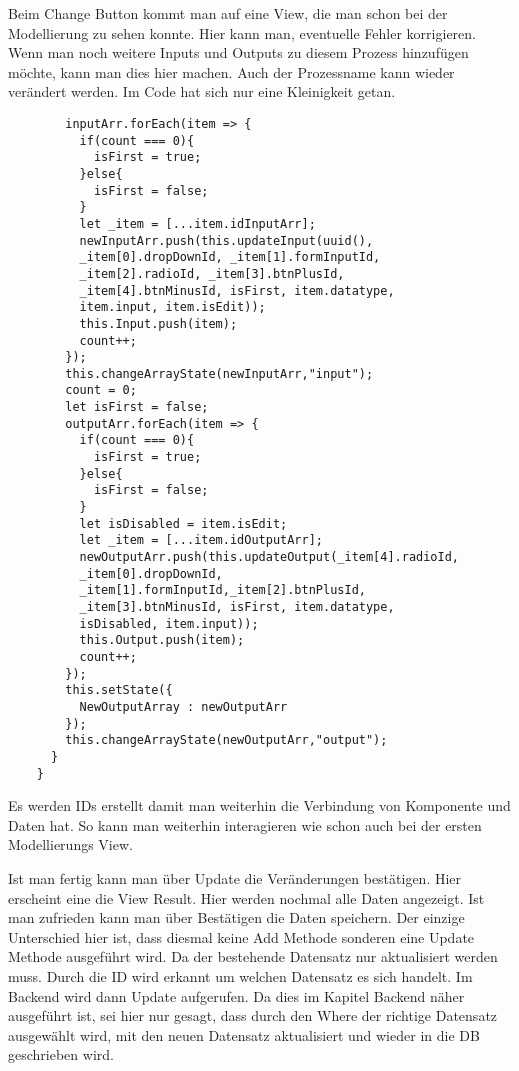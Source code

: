\documentclass[a4paper,11pt]{scrreprt}
\begin{document}
Beim Change Button kommt man auf eine View, die man schon bei der Modellierung zu sehen konnte. Hier kann man, eventuelle Fehler korrigieren. Wenn man noch weitere Inputs und Outputs zu diesem Prozess hinzufügen möchte, kann man dies hier machen. Auch der Prozessname kann wieder verändert werden. 
Im Code hat sich nur eine Kleinigkeit getan. 
\begin{lstlisting}
        inputArr.forEach(item => {
          if(count === 0){
            isFirst = true;
          }else{
            isFirst = false;
          }
          let _item = [...item.idInputArr];
          newInputArr.push(this.updateInput(uuid(),
          _item[0].dropDownId, _item[1].formInputId,
          _item[2].radioId, _item[3].btnPlusId,
          _item[4].btnMinusId, isFirst, item.datatype,
          item.input, item.isEdit));
          this.Input.push(item);
          count++;
        });
        this.changeArrayState(newInputArr,"input");
        count = 0;
        let isFirst = false;
        outputArr.forEach(item => {
          if(count === 0){
            isFirst = true;
          }else{
            isFirst = false;
          }
          let isDisabled = item.isEdit;
          let _item = [...item.idOutputArr];
          newOutputArr.push(this.updateOutput(_item[4].radioId,
          _item[0].dropDownId,
          _item[1].formInputId,_item[2].btnPlusId,
          _item[3].btnMinusId, isFirst, item.datatype,
          isDisabled, item.input));
          this.Output.push(item);
          count++;
        });
        this.setState({
          NewOutputArray : newOutputArr
        });
        this.changeArrayState(newOutputArr,"output");
      }
    }
\end{lstlisting}
Es werden IDs erstellt damit man weiterhin die Verbindung von Komponente und Daten hat. So kann man weiterhin interagieren wie schon auch bei der ersten Modellierungs View. 

Ist man fertig kann man über Update die Veränderungen bestätigen. Hier erscheint eine die View Result. Hier werden nochmal alle Daten angezeigt. Ist man zufrieden kann man über Bestätigen die Daten speichern. Der einzige Unterschied hier ist, dass diesmal keine Add Methode sonderen eine Update Methode ausgeführt wird. Da der bestehende Datensatz nur aktualisiert werden muss. Durch die ID wird erkannt um welchen Datensatz es sich handelt. Im Backend wird dann Update aufgerufen. Da dies im Kapitel Backend näher ausgeführt ist, sei hier nur gesagt, dass durch den Where der richtige Datensatz ausgewählt wird, mit den neuen Datensatz aktualisiert und wieder in die DB geschrieben wird. 
\end{document}
